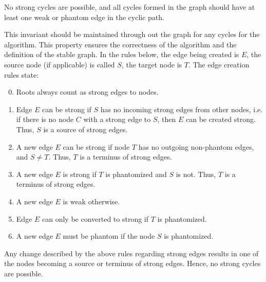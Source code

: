 \begin{theorem}
\label{theorem:cycleinvariant}
No strong cycles are possible, and all cycles formed in the graph should have at least one weak or phantom edge in the cyclic path.
\end{theorem}
\begin{proofs}
This invariant should be maintained through out the graph for any cycles for the algorithm. This property ensures the correctness of the algorithm and the definition of the stable graph. In the rules below, the edge being created is $E$, the source node (if applicable) is called $S$, the target node is $T$. The edge creation rules state: %
\begin{enumerate}
\setcounter{enumi}{-1}
\item Roots always count as strong edges to nodes.
\item Edge $E$ can be strong if $S$ has no incoming strong edges from other nodes, i.e. if there is no node $C$ with a strong edge to $S$, then $E$ can be created strong. Thus, $S$ is a source of strong edges.
\item A new edge $E$ can be strong if node $T$ has no outgoing non-phantom edges, and $S \neq T$. Thus, $T$ is a terminus of strong edges.
\item A new edge $E$ is strong if $T$ is phantomized and $S$ is not. Thus, $T$ is a terminus of strong edges.
\item A new edge $E$ is weak otherwise. %
\item Edge $E$ can only be converted to strong if $T$ is phantomized.
\item A new edge $E$ must be phantom if the node $S$ is phantomized.
\end{enumerate}
Any change described by the above rules regarding strong edges results in one of the nodes becoming a source or terminus of strong edges.
Hence, no strong cycles are possible.
\end{proofs}



